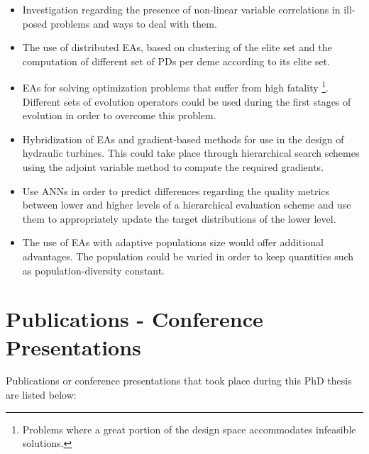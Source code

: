 \begin{itemize}
\item Investigation regarding the presence of non-linear variable correlations in ill-posed problems and ways to deal with them. 

\item The use of distributed EAs, based on clustering of the elite set and the computation of different set of PDs per deme according to its elite set. 

\item EAs for solving optimization problems that suffer from high fatality \footnote{Problems where a great portion of the design space accommodates infeasible solutions.}. Different sets of evolution operators could be used during the first stages of evolution in order to overcome this problem.

\item Hybridization of EAs and gradient-based methods for use in the design of hydraulic turbines. This could take place through hierarchical search schemes using the adjoint variable method to compute  the required gradients.

\item Use ANNs in order to predict differences regarding the quality metrics between lower and higher levels of a hierarchical evaluation scheme and use them to appropriately update the target distributions of the lower level.       

\item The use of EAs with adaptive populations size would offer additional advantages. The population could be varied in order to keep quantities such as population-diversity constant.  

\end{itemize}



\section{Publications - Conference Presentations}
Publications or conference presentations that took place during this PhD thesis are listed below:
 
